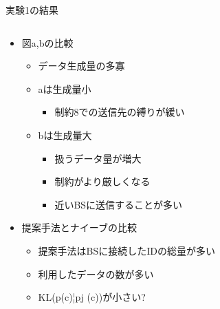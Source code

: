 \documentclass[unicode,12pt,aspectratio=169, dvipdfmx]{beamer}
\begin{document}
    \begin{frame}{実験1の結果}
        \begin{columns}
            \begin{column}[T]{.6\linewidth}
                \begin{itemize}
                \item 図a,bの比較
                    \begin{itemize}
                        \item データ生成量の多寡
                        \item aは生成量小
                            \begin{itemize}
                                \item 制約8での送信先の縛りが緩い
                            \end{itemize}   
                        \item bは生成量大
                            \begin{itemize}
                                \item 扱うデータ量が増大
                                \item 制約がより厳しくなる
                                \item 近いBSに送信することが多い
                            \end{itemize}
                        \end{itemize}
                \item 提案手法とナイーブの比較
                    \begin{itemize}
                        \item 提案手法はBSに接続したIDの総量が多い
                        \item 利用したデータの数が多い
                        \item KL(p(c)¦pj (c))が小さい?
                    \end{itemize}
                \end{itemize}    
            \end{column}
            \begin{column}[T]{.5\linewidth}
                \begin{center}

\end{center}
\end{column}
\end{columns}
\end{frame}
\end{document}
